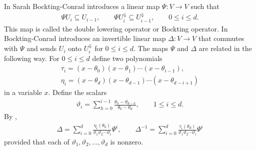 \documentclass[pdftex]{sigma}
\numberwithin{equation}{section}
\begin{document}
In \cite[Sections~11 and~15]{bockting1} Sarah Bockting-Conrad
introduces a linear map
$\Psi \colon V\to V$ such that
\begin{gather*}
\Psi U_i \subseteq U_{i-1}, \qquad
\Psi U^\Downarrow_i \subseteq U^\Downarrow_{i-1},
\qquad 0 \leq i \leq d.
\end{gather*}
This map is called the double lowering operator or Bockting operator.
In
\cite[Sections~9 and~15]{bockting1}
Bockting-Conrad introduces an invertible linear map
$\Delta\colon V\to V$ that commutes with $\Psi$ and
 sends $U_i$ onto $U^\Downarrow_i$ for $0 \leq i \leq d$.
The maps $\Psi$ and $\Delta$
are related in the following way.
For $0 \leq i \leq d$ define two polynomials
\begin{gather}
\tau_i = (x-\theta_0)(x-\theta_1)\cdots (x-\theta_{i-1}),
\label{eq:Tau}\\
\eta_i = (x-\theta_d)(x-\theta_{d-1})\cdots (x-\theta_{d-i+1})
\label{eq:Eta}
\end{gather}
in a variable $x$.
Define the scalars
\begin{gather*}
\vartheta_i = \sum_{h=0}^{i-1} \frac{\theta_h - \theta_{d-h}}{\theta_0 - \theta_d}, \qquad 1 \leq i \leq d.
\end{gather*}
By \cite[Theorem~17.1]{bockting1},
\begin{gather}
\Delta = \sum_{i=0}^d \frac{\eta_i (\theta_0)}{\vartheta_1 \vartheta_2
\cdots \vartheta_i} \Psi^i,
\qquad
\Delta^{-1} = \sum_{i=0}^d \frac{\tau_i (\theta_d)}{\vartheta_1 \vartheta_2
\cdots \vartheta_i} \Psi^i
\label{eq:DeltaDeltaInv}
\end{gather}
provided that each of $\vartheta_1, \vartheta_2,\ldots,\vartheta_d$ is nonzero.
\end{document}
